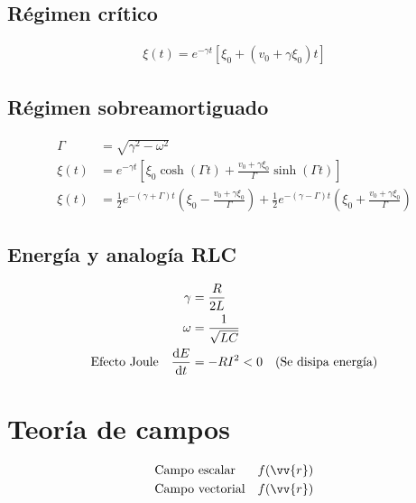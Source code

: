 \documentclass[a4paper, 8pt]{extarticle}
\renewcommand{\vec}[1]{\vv{{#1}}}
\begin{document}
\begin{multicols}{3}
  \subsection{Régimen crítico}
  \begin{align*}\xi (t) = e^{-\gamma t} \left[ \xi_0 + \left( v_0 + \gamma \xi_0 \right) t \right]
  \end{align*}
  \subsection{Régimen sobreamortiguado}
  \begin{align*}
    \Gamma  & = \sqrt{\gamma ^2 - \omega ^2}                                                                                                                                                                                        \\
    \xi (t) & = e^{-\gamma t} \left[ \xi_0 \cosh \left( \Gamma t \right) + \frac{v_0 + \gamma \xi_0}{\Gamma} \sinh \left( \Gamma t \right) \right]                                                                                  \\
    \xi (t) & = \frac{1}{2} e^{-\left( \gamma + \Gamma \right)t} \left( \xi_0 - \frac{v_0 + \gamma\xi_0}{\Gamma} \right) + \frac{1}{2} e^{-\left( \gamma - \Gamma \right)t} \left( \xi_0 + \frac{v_0 + \gamma\xi_0}{\Gamma} \right)
  \end{align*}
  \subsection{Energía y analogía RLC}
  \begin{align*}
     &                           & \gamma    & = \frac{R}{2L}                                      \\
     &                           & \omega    & = \frac{1}{\sqrt{LC}}                               \\
     & \textnormal{Efecto Joule} & \dv{E}{t} & = - RI^2 < 0 \quad \textnormal{(Se disipa energía)}
  \end{align*}

  \section{Teoría de campos}
  \begin{align*}
     & \textnormal{Campo escalar}   & f(\vec{r}) & \\
     & \textnormal{Campo vectorial} & f(\vec{r}) & \\
  \end{align*}

\end{multicols}
\end{document}
